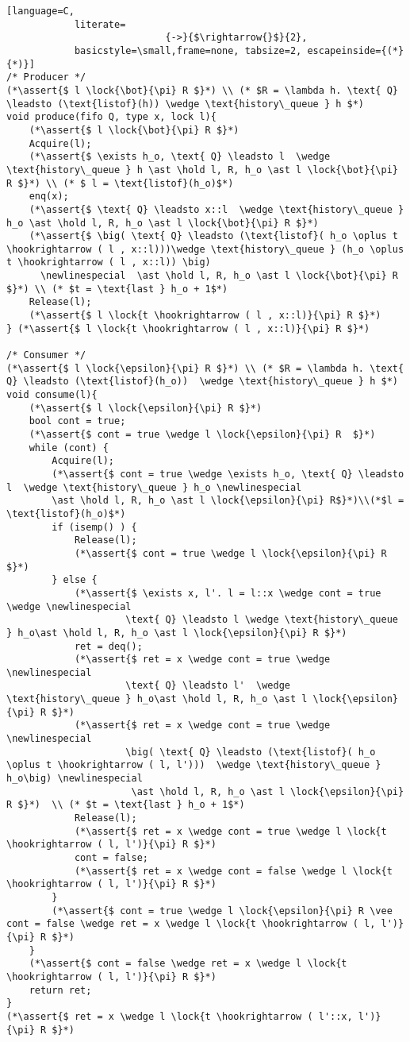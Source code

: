 \documentclass[8pt]{article}
\newcommand{\lock}[2]{ \square \hspace{-1ex} \xrightarrow[#1]{#2}}
\newcommand{\hold}{\text{Hold }}
\newcommand{\assert}[1]{\textcolor{blue}{ \{ #1 \}  } }
\newcommand{\newlinespecial}{\newline \hphantom{100pt}}
\begin{document}
\begin{lstlisting}[language=C,
			literate=
               				{->}{$\rightarrow{}$}{2},
			basicstyle=\small,frame=none, tabsize=2, escapeinside={(*}{*)}]
/* Producer */
(*\assert{$ l \lock{\bot}{\pi} R $}*) \\ (* $R = \lambda h. \text{ Q} \leadsto (\text{listof}(h)) \wedge \text{history\_queue } h $*)
void produce(fifo Q, type x, lock l){
	(*\assert{$ l \lock{\bot}{\pi} R $}*)
	Acquire(l);
	(*\assert{$ \exists h_o, \text{ Q} \leadsto l  \wedge \text{history\_queue } h \ast \hold l, R, h_o \ast l \lock{\bot}{\pi} R $}*) \\ (* $ l = \text{listof}(h_o)$*)
	enq(x);
	(*\assert{$ \text{ Q} \leadsto x::l  \wedge \text{history\_queue } h_o \ast \hold l, R, h_o \ast l \lock{\bot}{\pi} R $}*)
	(*\assert{$ \big( \text{ Q} \leadsto (\text{listof}( h_o \oplus t \hookrightarrow ( l , x::l)))\wedge \text{history\_queue } (h_o \oplus t \hookrightarrow ( l , x::l)) \big)
	  \newlinespecial  \ast \hold l, R, h_o \ast l \lock{\bot}{\pi} R $}*) \\ (* $t = \text{last } h_o + 1$*)
	Release(l);
	(*\assert{$ l \lock{t \hookrightarrow ( l , x::l)}{\pi} R $}*)
} (*\assert{$ l \lock{t \hookrightarrow ( l , x::l)}{\pi} R $}*)
	
/* Consumer */
(*\assert{$ l \lock{\epsilon}{\pi} R $}*) \\ (* $R = \lambda h. \text{ Q} \leadsto (\text{listof}(h_o))  \wedge \text{history\_queue } h $*)
void consume(l){
	(*\assert{$ l \lock{\epsilon}{\pi} R $}*)
	bool cont = true;
	(*\assert{$ cont = true \wedge l \lock{\epsilon}{\pi} R  $}*)
	while (cont) {
		Acquire(l);
		(*\assert{$ cont = true \wedge \exists h_o, \text{ Q} \leadsto l  \wedge \text{history\_queue } h_o \newlinespecial
		\ast \hold l, R, h_o \ast l \lock{\epsilon}{\pi} R$}*)\\(*$l = \text{listof}(h_o)$*)
		if (isemp() ) {
			Release(l);
			(*\assert{$ cont = true \wedge l \lock{\epsilon}{\pi} R  $}*)	
		} else {
			(*\assert{$ \exists x, l'. l = l::x \wedge cont = true \wedge \newlinespecial
					 \text{ Q} \leadsto l \wedge \text{history\_queue } h_o\ast \hold l, R, h_o \ast l \lock{\epsilon}{\pi} R $}*)
			ret = deq();
			(*\assert{$ ret = x \wedge cont = true \wedge \newlinespecial
					 \text{ Q} \leadsto l'  \wedge \text{history\_queue } h_o\ast \hold l, R, h_o \ast l \lock{\epsilon}{\pi} R $}*)
			(*\assert{$ ret = x \wedge cont = true \wedge \newlinespecial
					 \big( \text{ Q} \leadsto (\text{listof}( h_o \oplus t \hookrightarrow ( l, l')))  \wedge \text{history\_queue } h_o\big) \newlinespecial
					  \ast \hold l, R, h_o \ast l \lock{\epsilon}{\pi} R $}*)  \\ (* $t = \text{last } h_o + 1$*)
			Release(l);
			(*\assert{$ ret = x \wedge cont = true \wedge l \lock{t \hookrightarrow ( l, l')}{\pi} R $}*)
			cont = false;
			(*\assert{$ ret = x \wedge cont = false \wedge l \lock{t \hookrightarrow ( l, l')}{\pi} R $}*)
		}
		(*\assert{$ cont = true \wedge l \lock{\epsilon}{\pi} R \vee  cont = false \wedge ret = x \wedge l \lock{t \hookrightarrow ( l, l')}{\pi} R $}*)	
	}
	(*\assert{$ cont = false \wedge ret = x \wedge l \lock{t \hookrightarrow ( l, l')}{\pi} R $}*)		
	return ret;
}
(*\assert{$ ret = x \wedge l \lock{t \hookrightarrow ( l'::x, l')}{\pi} R $}*)
 

\end{lstlisting}
\end{document}
